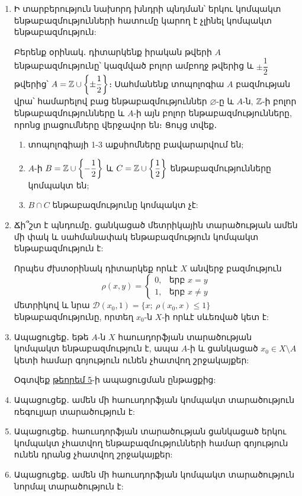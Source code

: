 \begin{enumerate}[label=\thesection.\arabic*.]
\item Ի տարբերություն նախորդ խնդրի պնդման՝ երկու կոմպակտ ենթաբազմու\-թ\-յուն\-ների հատումը կարող է չլինել կոմպակտ ենթաբազմություն:
\par Բերենք օրինակ․ դիտարկենք իրական թվերի $A$ ենթաբազմությունը՝ կազմված բոլոր ամբողջ թվերից և $\pm \dfrac{1}{2}$ թվերից՝ $A = \mathbb{Z} \cup \left\{\pm \dfrac{1}{2}\right\}$։ Սահմանենք տոպոլո\-գիա $A$ բազմության վրա՝ համարելով բաց ենթաբազմություններ $\varnothing$-ը և $A$-ն, $\mathbb{Z}$-ի բոլոր ենթաբազմությունները և $A$-ի այն բոլոր ենթաբազմությունները, որոնց լրացումները վերջավոր են։ Ցույց տվեք․
\begin{enumerate}
    \item[1.] տոպոլոգիայի 1-3 աքսիոմները բավարարվում են;
    \item[2.] $A$-ի $B = \mathbb{Z} \cup \left\{-\dfrac{1}{2}\right\}$ և $C = \mathbb{Z} \cup \left\{\dfrac{1}{2}\right\}$ ենթաբազմությունները կոմպակտ են;
    \item[3.] $B \cap C$ ենթաբազմությունը կոմպակտ չէ:
\end{enumerate}

\item Ճի՞շտ է պնդումը․ ցանկացած մետրիկային տարածության ամեն մի փակ և սահմանափակ ենթաբազմություն կոմպակտ ենթաբազմություն է:

\begin{hint}
Որպես ժխտօրինակ դիտարկեք որևէ $X$ անվերջ բազմություն 
\[
\rho(x, y) = \begin{cases}
    0, & \text{երբ } x=y \\
    1, & \text{երբ } x\ne y 
\end{cases}
\]
մետրիկով և նրա $\mathcal{D}(x_0, 1) = \{x;\ \rho(x_0, x) \le 1 \}$ ենթաբազմությունը, որտեղ $x_0$-ն $X$-ի որևէ սևեռված կետ է:
\end{hint}

\item Ապացուցեք․ եթե $A$-ն $X$ հաուսդորֆյան տարածության կոմպակտ ենթա\-բազ\-մություն է, ապա $A$-ի և ցանկացած $x_0 \in X \setminus A$ կետի համար գոյություն ունեն չհատվող շրջակայքեր:

\begin{hint}
Օգտվեք \hyperref[ch17thm5]{թեորեմ 5}-ի ապացուցման ընթացքից:
\end{hint}

\item Ապացուցեք․ ամեն մի հաուսդորֆյան կոմպակտ տարածություն ռեգուլյար տարա\-ծություն է:

\item Ապացուցեք․ հաուսդորֆյան տարածության ցանկացած երկու կոմպակտ չհատ\-վող ենթաբազմությունների համար գոյություն ունեն դրանց չհատվող շրջա\-կայ\-քեր:

\item Ապացուցեք․ ամեն մի հաուսդորֆյան կոմպակտ տարածություն նորմալ տարա\-ծություն է:

\end{enumerate}
